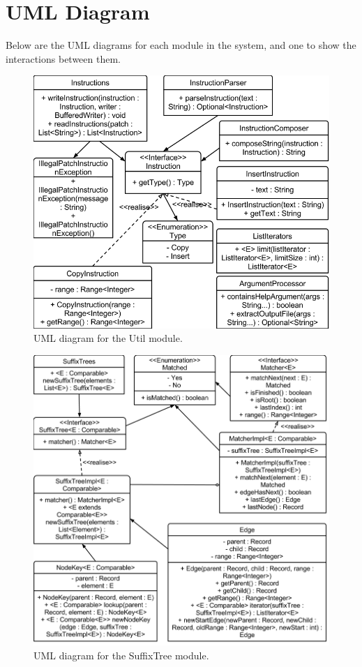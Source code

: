 \section{UML Diagram}

Below are the UML diagrams for each module in the system, and one to show the interactions between them.

\begin{figure}[H]
\begin{center}
\includegraphics[width=\textwidth]{design/diffrUML-util.png}
\end{center}
\caption{UML diagram for the Util module.}
\label{fig:utilUML}
\end{figure}

\begin{figure}[H]
\begin{center}
\includegraphics[width=\textwidth]{design/diffrUML-suffixtree.png}
\end{center}
\caption{UML diagram for the SuffixTree module.}
\label{fig:suffixTreeUML}
\end{figure}

